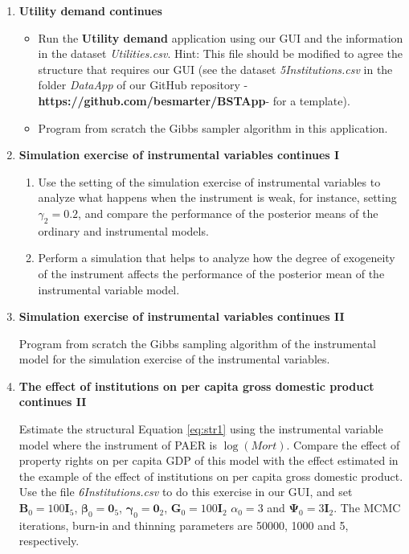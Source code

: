\begin{enumerate}
\item \textbf{Utility demand continues}

\begin{itemize}
	\item Run the \textbf{Utility demand} application using our GUI and the information in the dataset \textit{Utilities.csv}. Hint: This file should be modified to agree the structure that requires our GUI (see the dataset \textit{5Institutions.csv} in the folder \textit{DataApp} of our GitHub repository -\textbf{https://github.com/besmarter/BSTApp}- for a template).
	\item Program from scratch the Gibbs sampler algorithm in this application.   
\end{itemize}

\item \textbf{Simulation exercise of instrumental variables continues I}

\begin{enumerate}
	\item Use the setting of the simulation exercise of instrumental variables to analyze what happens when the instrument is weak, for instance, setting $\gamma_2=0.2$, and compare the performance of the posterior means of the ordinary and instrumental models.
	\item Perform a simulation that helps to analyze how the degree of exogeneity of the instrument affects the performance of the posterior mean of the instrumental variable model.	 
\end{enumerate}

\item \textbf{Simulation exercise of instrumental variables continues II}

Program from scratch the Gibbs sampling algorithm of the instrumental model for the simulation exercise of the instrumental variables.

\item \textbf{The effect of institutions on per capita gross domestic product continues II}

Estimate the structural Equation \ref{eq:str1} using the instrumental variable model where the instrument of PAER is $\log(\textit{Mort})$. Compare the effect of property rights on per capita GDP of this model with the effect estimated in the example of the effect of institutions on per capita gross domestic product. Use the file \textit{6Institutions.csv} to do this exercise in our GUI, and set $\bm{B}_0=100\bm{I}_5$, $\bm{\beta}_0=\bm{0}_5$, $\bm{\gamma}_0=\bm{0}_2$, $\bm{G}_0=100\bm{I}_2$ $\alpha_0=3$ and $\bm{\Psi}_0=3\bm{I}_2$. The MCMC iterations, burn-in and thinning parameters are 50000, 1000 and 5, respectively.


\end{enumerate}
